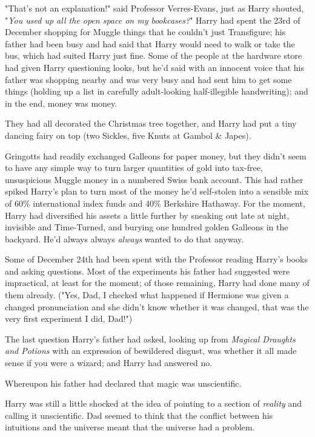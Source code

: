 "That's not an explanation!" said Professor Verres-Evans, just as Harry
shouted, "\emph{You used up all the open space on my bookcases?}"
\later
Harry had spent the 23rd of December shopping for Muggle things that he
couldn't just Transfigure; his father had been busy and had said that Harry
would need to walk or take the bus, which had suited Harry just fine. Some of
the people at the hardware store had given Harry questioning looks, but he'd
said with an innocent voice that his father was shopping nearby and was very
busy and had sent him to get some things (holding up a list in carefully
adult-looking half-illegible handwriting); and in the end, money was money.

They had all decorated the Christmas tree together, and Harry had put a tiny
dancing fairy on top (two Sickles, five Knuts at Gambol \& Japes).

Gringotts had readily exchanged Galleons for paper money, but they didn't seem
to have any simple way to turn larger quantities of gold into tax-free,
unsuspicious Muggle money in a numbered Swiss bank account. This had rather
spiked Harry's plan to turn most of the money he'd self-stolen into a sensible
mix of 60\% international index funds and 40\% Berkshire Hathaway. For the
moment, Harry had diversified his assets a little further by sneaking out late
at night, invisible and Time-Turned, and burying one hundred golden Galleons in
the backyard. He'd always always \emph{always} wanted to do that anyway.

Some of December 24th had been spent with the Professor reading Harry's books
and asking questions. Most of the experiments his father had suggested were
impractical, at least for the moment; of those remaining, Harry had done many
of them already. ("Yes, Dad, I checked what happened if Hermione was given a
changed pronunciation and she didn't know whether it was changed, that was the
very first experiment I did, Dad!")

The last question Harry's father had asked, looking up from \emph{Magical
Draughts and Potions} with an expression of bewildered disgust, was whether it
all made sense if you were a wizard; and Harry had answered no.

Whereupon his father had declared that magic was unscientific.

Harry was still a little shocked at the idea of pointing to a section of
\emph{reality} and calling it unscientific. Dad seemed to think that the
conflict between his intuitions and the universe meant that the universe had a
problem.

